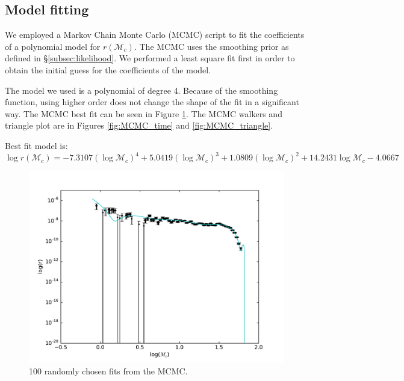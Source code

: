 \subsection{Model fitting}
\label{subsec:fitting}
We employed a Markov Chain Monte Carlo (MCMC) script to fit the coefficients of a polynomial model for $r(\mathcal{M}_c)$. The MCMC uses the smoothing prior as defined in \S\ref{subsec:likelihood}. We performed a least square fit first in order to obtain the initial guess for the coefficients of the model.

The model we used is a polynomial of degree 4. Because of the smoothing function, using higher order does not change the shape of the fit in a significant way. The MCMC best fit can be seen in Figure \ref{fig:line_MCMC}. The MCMC walkers and triangle plot are in Figures \ref{fig:MCMC_time} and \ref{fig:MCMC_triangle}.

Best fit model is:
\begin{equation}
\label{MCMC_best_fit}
\log r(\mathcal{M}_c) = -7.3107 (\log\mathcal{M}_c)^4 + 5.0419 (\log\mathcal{M}_c)^3 + 1.0809 (\log\mathcal{M}_c)^2 + 14.2431 \log\mathcal{M}_c - 4.0667
\end{equation}

\begin{figure}[ht]
  \includegraphics[width=\columnwidth]{img/line-MCMC.pdf}
  \caption{100 randomly chosen fits from the MCMC.}
  \label{fig:line_MCMC}
\end{figure}

